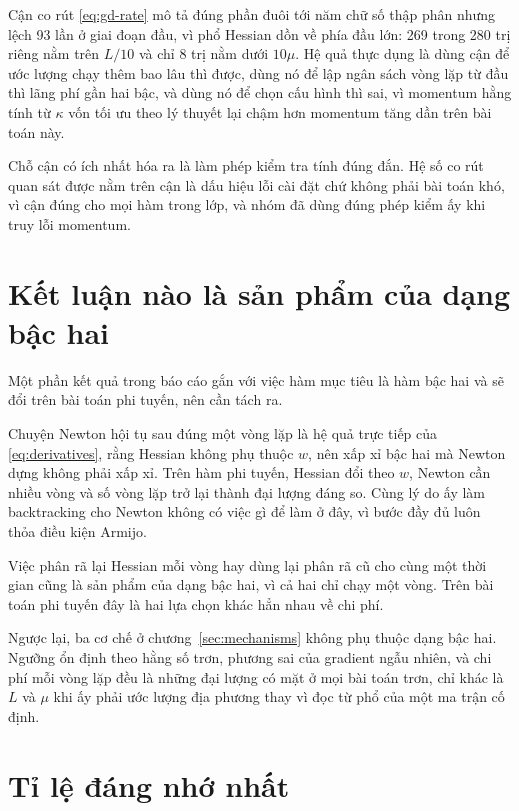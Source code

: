 Cận co rút \eqref{eq:gd-rate} mô tả đúng phần đuôi tới năm chữ số thập phân nhưng
lệch 93 lần ở giai đoạn đầu, vì phổ Hessian dồn về phía đầu lớn: 269 trong 280
trị riêng nằm trên $L/10$ và chỉ 8 trị nằm dưới $10\mu$. Hệ quả thực dụng là dùng
cận để ước lượng chạy thêm bao lâu thì được, dùng nó để lập ngân sách vòng lặp từ
đầu thì lãng phí gần hai bậc, và dùng nó để chọn cấu hình thì sai, vì momentum
hằng tính từ $\kappa$ vốn tối ưu theo lý thuyết lại chậm hơn momentum tăng dần
trên bài toán này.

Chỗ cận có ích nhất hóa ra là làm phép kiểm tra tính đúng đắn. Hệ số co rút quan
sát được nằm trên cận là dấu hiệu lỗi cài đặt chứ không phải bài toán khó, vì cận
đúng cho mọi hàm trong lớp, và nhóm đã dùng đúng phép kiểm ấy khi truy lỗi
momentum.

\section{Kết luận nào là sản phẩm của dạng bậc hai}
\label{sec:conclusion-quadratic}

Một phần kết quả trong báo cáo gắn với việc hàm mục tiêu là hàm bậc hai và sẽ đổi
trên bài toán phi tuyến, nên cần tách ra.

Chuyện Newton hội tụ sau đúng một vòng lặp là hệ quả trực tiếp của
\eqref{eq:derivatives}, rằng Hessian không phụ thuộc $w$, nên xấp xỉ bậc hai mà
Newton dựng không phải xấp xỉ. Trên hàm phi tuyến, Hessian đổi theo $w$, Newton
cần nhiều vòng và số vòng lặp trở lại thành đại lượng đáng so. Cùng lý do ấy làm
backtracking cho Newton không có việc gì để làm ở đây, vì bước đầy đủ luôn thỏa
điều kiện Armijo.

Việc phân rã lại Hessian mỗi vòng hay dùng lại phân rã cũ cho cùng một thời gian
cũng là sản phẩm của dạng bậc hai, vì cả hai chỉ chạy một vòng. Trên bài toán phi
tuyến đây là hai lựa chọn khác hẳn nhau về chi phí.

Ngược lại, ba cơ chế ở chương~\ref{sec:mechanisms} không phụ thuộc dạng bậc hai.
Ngưỡng ổn định theo hằng số trơn, phương sai của gradient ngẫu nhiên, và chi phí
mỗi vòng lặp đều là những đại lượng có mặt ở mọi bài toán trơn, chỉ khác là $L$
và $\mu$ khi ấy phải ước lượng địa phương thay vì đọc từ phổ của một ma trận cố
định.

\section{Tỉ lệ đáng nhớ nhất}
\label{sec:conclusion-scale}


